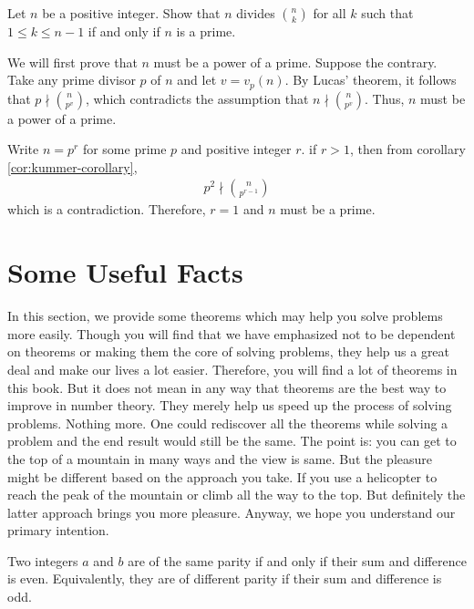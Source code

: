 \documentclass{subfile}
\begin{document}
\begin{problem}
	Let $n$ be a positive integer. Show that $n$ divides $\binom{n}{k}$ for all $k$ such that $1 \leq k \leq n-1$ if and only if $n$ is a prime.
\end{problem}

\begin{solution}
	We will first prove that $n$ must be a power of a prime. Suppose the contrary. Take any prime divisor $p$ of $n$ and let $v=v_p(n)$. By Lucas' theorem, it follows that $p \nmid\binom{n}{p^v}$, which contradicts the assumption that $n \nmid\binom{n}{p^v}$. Thus, $n$ must be a power of a prime.

	Write $n=p^r$ for some prime $p$ and positive integer $r$. if $r>1$, then from corollary \ref{cor:kummer-corollary},
	\begin{align*}
		p^2\nmid\binom{n}{p^{r-1}}
	\end{align*}
	which is a contradiction. Therefore, $r=1$ and $n$ must be a prime.

\end{solution}

	\section{Some Useful Facts}\label{sec:theoremsindiv}
	In this section, we provide some theorems which may help you solve problems more easily. Though you will find that we have emphasized not to be dependent on theorems or making them the core of solving problems, they help us a great deal and make our lives a lot easier. Therefore, you will find a lot of theorems in this book. But it does not mean in any way that theorems are the best way to improve in number theory. They merely help us speed up the process of solving problems. Nothing more. One could rediscover all the theorems while solving a problem and the end result would still be the same. The point is: you can get to the top of a mountain in many ways and the view is same. But the pleasure might be different based on the approach you take. If you use a helicopter to reach the peak of the mountain or climb all the way to the top. But definitely the latter approach brings you more pleasure. Anyway, we hope you understand our primary intention.

	\begin{theorem}
		Two integers $a$ and $b$ are of the same parity if and only if their sum and difference is even. Equivalently, they are of different parity if their sum and difference is odd.
	\end{theorem}
\end{document}
